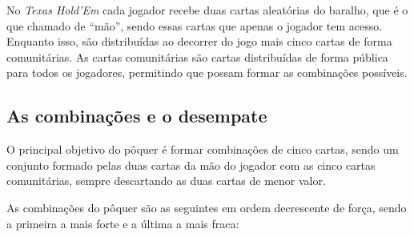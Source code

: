 No \textit{Texas Hold'Em} cada jogador recebe duas cartas aleatórias do baralho, que é o que chamado de ``mão'', sendo essas cartas que apenas o jogador tem acesso. Enquanto isso, são distribuídas ao decorrer do jogo mais cinco cartas de forma comunitárias. As cartas comunitárias são cartas distribuídas de forma pública para todos os jogadores, permitindo que possam formar as combinações possíveis.

\subsection{As combinações e o desempate}

O principal objetivo do pôquer é formar combinações de cinco cartas, sendo um conjunto formado pelas duas cartas da mão do jogador com as cinco cartas comunitárias, sempre descartando as duas cartas de menor valor.

As combinações do pôquer são as seguintes em ordem decrescente de força, sendo a primeira a mais forte e a última a mais fraca:

